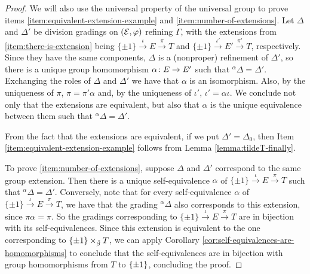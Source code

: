 \begin{proof}
    We will also use the universal property of the universal group to prove items \eqref{item:equivalent-extension-example} and \eqref{item:number-of-extensions}.
    Let $\Delta$ and $\Delta'$ be division gradings on $(\mathcal E, \varphi)$ refining $\Gamma$, with the extensions from \eqref{item:there-is-extension} being $\{ \pm 1 \} \xrightarrow{\iota} E \xrightarrow{\pi} T$ and $\{ \pm 1 \} \xrightarrow{\iota'} E' \xrightarrow{\pi'} T$, respectively. 
    Since they have the same components, $\Delta$ is a (nonproper) refinement of $\Delta'$, so there is a unique group homomorphism $\alpha\colon E \to E'$ such that ${}^\alpha \Delta = \Delta'$. 
    Exchanging the roles of $\Delta$ and $\Delta'$ we have that $\alpha$ is an isomorphism. 
    Also, by the uniqueness of $\pi$, $\pi = \pi' \alpha$ and, by the uniqueness of $\iota'$, $\iota' = \alpha \iota$. 
    We conclude not only that the extensions are equivalent, but also that $\alpha$ is the unique equivalence between them such that ${}^\alpha \Delta = \Delta'$. 
    
    From the fact that the extensions are equivalent, if we put $\Delta' = \Delta_0$, then Item \eqref{item:equivalent-extension-example} follows from Lemma \ref{lemma:tildeT-finally}. 
    
    To prove \eqref{item:number-of-extensions}, 
    suppose $\Delta$ and $\Delta'$ correspond to the same group extension. 
    Then there is a unique self-equivalence $\alpha$ of $\{ \pm 1 \} \xrightarrow{\iota} E \xrightarrow{\pi} T$ such that ${}^\alpha \Delta = \Delta'$. 
    Conversely,
    note that for every self-equivalence $\alpha$ of $\{ \pm 1 \} \xrightarrow{\iota} E \xrightarrow{\pi} T$, we have that the grading ${}^\alpha \Delta$ also corresponds to this extension, since $\pi\alpha = \pi$. 
    So the gradings corresponding to $\{ \pm 1 \} \xrightarrow{\iota} E \xrightarrow{\pi} T$ are in bijection with its self-equivalences. 
    Since this extension is equivalent to the one corresponding to $\{ \pm 1 \} \times_{\tilde\beta} T$, we can apply Corollary \ref{cor:self-equivalences-are-homomorphisms} to conclude that the self-equivalences are in bijection with group homomorphisms from $T$ to $\{ \pm 1 \}$, concluding the proof.
    
    
    
    

\end{proof}
